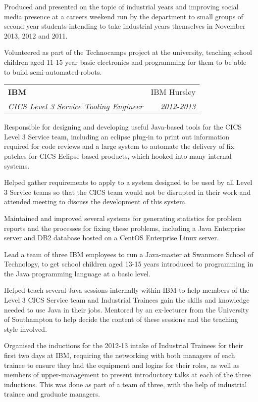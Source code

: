 \documentclass[letterpaper,11pt]{article}
\makeatletter
\newlength{\outerbordwidth}
\newcommand{\resheading}[1]{\vspace{8pt}
  \parbox{\textwidth}{\setlength{\FrameSep}{\outerbordwidth}
    \begin{shaded}
\setlength{\fboxsep}{0pt}\framebox[\textwidth][l]{\setlength{\fboxsep}{4pt}\fcolorbox{shadecolorB}{shadecolorB}{\textbf{\sffamily{\mbox{~}\makebox[6.762in][l]{\large #1} \vphantom{p\^{E}}}}}}
    \end{shaded}
  }\vspace{-5pt}
}
\newcommand{\ressubheading}[4]{
\begin{tabular*}{6.5in}{l@{\cftdotfill{\cftsecdotsep}\extracolsep{\fill}}r}
		\textbf{#1} & #2 \\
		\textit{#3} & \textit{#4} \\
\end{tabular*}\vspace{-6pt}}
\makeatother
\begin{document}
Produced and presented on the topic of industrial years and improving social
media presence at a careers weekend run by the department to small groups of
second year students intending to take industrial years themselves in November
2013, 2012 and 2011.

Volunteered as part of the Technocamps project at the university, teaching 
school children aged 11-15 year basic electronics and programming for them to 
be able to build semi-automated robots.



\resheading{Work Experience}
\ressubheading{IBM}{IBM Hursley}{CICS Level 3 Service Tooling Engineer}
{2012-2013}
\vspace{10pt}

Responsible for designing and developing useful Java-based tools for the CICS 
Level 3 Service team, including an eclipse plug-in to print out information 
required for code reviews and a large system to automate the delivery of fix 
patches for CICS Eclipse-based products, which hooked into many internal 
systems.

Helped gather requirements to apply to a system designed to be used by all 
Level 3 Service teams so that the CICS team would not be disrupted in their 
work and attended meeting to discuss the development of this system.

Maintained and improved several systems for generating statistics for problem 
reports and the processes for fixing these problems, including a Java 
Enterprise server and DB2 database hosted on a CentOS Enterprise Linux server.

Lead a team of three IBM employees to run a Java-master at Swanmore School of 
Technology, to get school children aged 13-15 years introduced to programming 
in the Java programming language at a basic level.

Helped teach several Java sessions internally within IBM to help members of the
Level 3 CICS Service team and Industrial Trainees gain the skills and knowledge
needed to use Java in their jobs. Mentored by an ex-lecturer from the 
University of Southampton to help decide the content of these sessions and the 
teaching style involved.

Organised the inductions for the 2012-13 intake of Industrial Trainees for 
their first two days at IBM, requiring the networking with both managers of 
each trainee to ensure they had the equipment and logins for their roles, as 
well as members of upper-management to present introductory talks at each of 
the three inductions. This was done as part of a team of three, with the help 
of industrial trainee and graduate managers.
\end{document}
